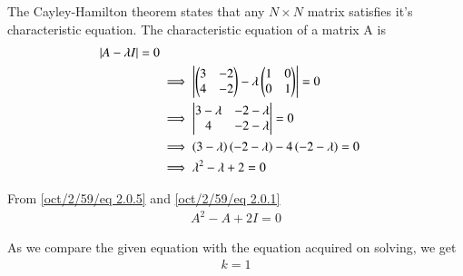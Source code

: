 
The Cayley-Hamilton theorem states that any $N\times N$ matrix satisfies it's characteristic equation.  The characteristic equation of a matrix A is 
\begin{align}
    |{A - \lambda I}| = 0\label{oct/2/59/eq 2.0.1}\\
    & \implies \begin{vmatrix}\begin{pmatrix}3 & -2 \\ 4 & -2\end{pmatrix} - \lambda\begin{pmatrix}1 & 0 \\ 0 & 1\end{pmatrix}\end{vmatrix} = 0\\
    & \implies \begin{vmatrix}3 - \lambda & -2 - \lambda \\ 4 & -2-\lambda\end{vmatrix} = 0\\
    & \implies \left(3-\lambda\right)\left(-2-\lambda\right) - 4\left(-2-\lambda\right) = 0\\
    & \implies \lambda^2 -\lambda +2 = 0 \label{oct/2/59/eq 2.0.5}\\
\end{align}

From \eqref{oct/2/59/eq 2.0.5} and \eqref{oct/2/59/eq 2.0.1}
\begin{align}
    A^2 - A +2I = 0
\end{align}

As we compare the given equation with the equation acquired on solving, we get
\begin{align}
    k = 1
\end{align}
